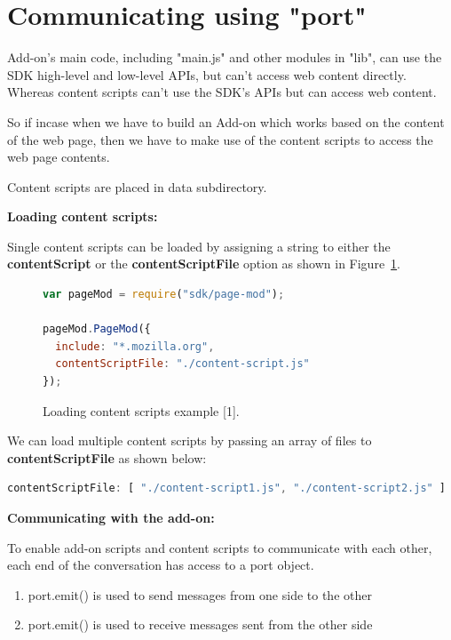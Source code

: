 \section{Communicating using "port"}

Add-on's main code, including "main.js" and other modules in "lib", can use the SDK high-level and low-level APIs, but can't access web content directly. Whereas content scripts can't use the SDK's APIs but can access web content.

So if incase when we have to build an Add-on which works based on the content of the web page, then we have to make use of the content scripts to access the web page contents.

Content scripts are placed in data subdirectory.


\textbf{Loading content scripts:}


Single content scripts can be loaded by assigning a string to either the \textbf{contentScript} or the \textbf{contentScriptFile} option as shown in Figure~\ref{fig:loadingcs}.
\begin{figure}[h]
  \centering
\begin{lstlisting}[language=JavaScript]
var pageMod = require("sdk/page-mod");

pageMod.PageMod({
  include: "*.mozilla.org",
  contentScriptFile: "./content-script.js"
});
\end{lstlisting}
    \caption[Loading content scripts example]{Loading content scripts example [1].}
    \label{fig:loadingcs}
\end{figure}


We can load multiple content scripts by passing an array of files to \textbf{contentScriptFile} as shown below:
\begin{lstlisting}[frame=none,numbers=none,language=JavaScript]
contentScriptFile: [ "./content-script1.js", "./content-script2.js" ]
\end{lstlisting}


\textbf{Communicating with the add-on:}

To enable add-on scripts and content scripts to communicate with each other, each end of the conversation has access to a port object.
\begin{enumerate}
\item port.emit() is used to send messages from one side to the other 
\item port.emit() is used to receive messages sent from the other side
\end{enumerate}

